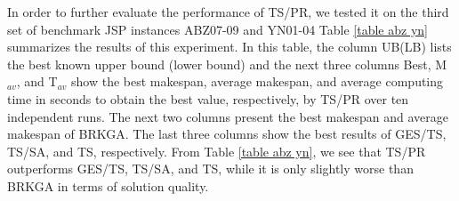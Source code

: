 \documentclass[authoryear,12pt]{elsarticle}
\begin{document}
\begin{table}[!h]
\begin{scriptsize}
\caption{Computational results and comparisons for the third set of instances ABZ07-09 and YN01-04}
\label{table abz yn}
\end{scriptsize}
\end{table}


In order to further evaluate the performance of TS/PR, we tested it on the third set of benchmark JSP instances ABZ07-09 and YN01-04
Table \ref{table abz yn} summarizes the results of this experiment. In this table, the column UB(LB) lists the best known upper bound (lower bound) and the next three columns Best, M$_{av}$, and T$_{av}$ show the best makespan, average makespan, and average computing time in seconds to obtain the best value, respectively, by TS/PR over ten independent runs. The next two columns present the best makespan and average makespan of BRKGA. The last three columns show the best results of GES/TS, TS/SA, and TS, respectively. From Table \ref{table abz yn}, we see that TS/PR outperforms GES/TS, TS/SA, and TS, while it is only slightly worse than BRKGA in terms of solution quality.
\end{document}
